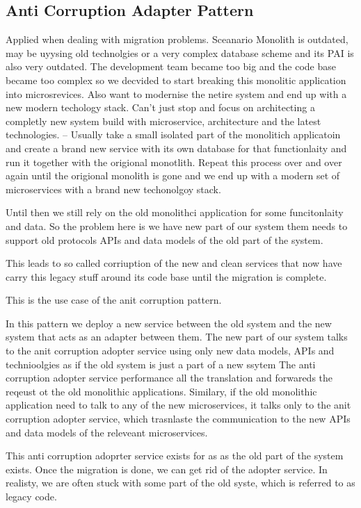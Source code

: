 \documentclass[a4paper, 11pt]{book}
\begin{document}
{    \subsection{Anti Corruption Adapter Pattern}
    Applied when dealing with migration problems.
    Sceanario
    Monolith is outdated, may be uyysing old technolgies or a very complex database scheme and its PAI is also very outdated.
    The development team became too big and the code base became too complex so we decvided to start breaking this monolitic application into microsrevices.
    Also want to modernise the netire system and end up with a new modern techology stack.
    Can't just stop and focus on architecting a completly new system build with microservice, architecture and the latest technologies.
    -- Usually take a small isolated part of the monolitich applicatoin and create a brand new service with its own database for that functionlaity and run it together with the origional monotlith.
    Repeat this process over and over again until the origional monolith is gone and we end up with a modern set of microservices with a brand new techonolgoy stack.

    Until then we still rely on the old monolithci application for some funcitonlaity and data.
    So the problem here is we have new part of our system them needs to support old protocols APIs and data models of the old part of the system.

    This leads to so called corriuption of the new and clean services that now have carry this legacy stuff around its code base until the migration is complete.

    This is the use case of the anit corruption pattern.

    In this pattern we deploy a new service between the old system and the new system that acts as an adapter between them.
    The new part of our system talks to the anit corruption adopter service using only new data models, APIs and technioolgies as if the old system is just a part of a new ssytem
    The anti corruption adopter service performance all the translation and forwareds the reqeust ot the old monolithic applications.
    Similary, if the old monolithic application need to talk to any of the new microservices, it talks only to the anit corruption adopter service, which trasnlaste the communication to the new APIs and data models of the releveant microservices.

    This anti corruption adoprter service exists for as as the old part of the system exists.
    Once the migration is done, we can get rid of the adopter service.
    In realisty, we are often stuck with some part of the old syste, which is referred to as legacy code.

}
\end{document}
